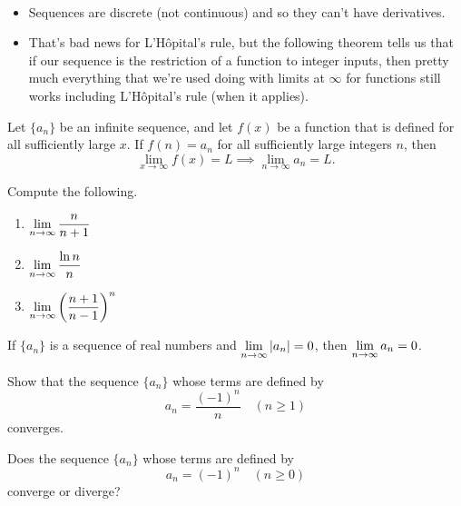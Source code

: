 \newpage

\begin{remark}\,
\begin{itemize}
\item Sequences are discrete (not continuous) and so they can't have derivatives.
\item That's bad news for L'H\^opital's rule, but the following theorem tells us that if our sequence is the restriction of a function to integer inputs, then pretty much everything that we're used doing with limits at $\infty$ for functions still works including L'H\^opital's rule (when it applies).
\end{itemize}
\end{remark}

\begin{theorem}
Let $\{a_n\}$ be an infinite sequence, and let $f(x)$ be a function that is defined for all sufficiently large $x$.
If $f(n) = a_n$ for all sufficiently large integers $n$, then
\begin{equation*}
\lim_{x\to\infty}f(x) = L \implies \lim_{n\to\infty} a_n=  L.
\end{equation*}
\end{theorem}

\begin{example}
Compute the following.
\begin{enumerate}
\item $\displaystyle\lim_{n\to\infty}\frac{n}{n+1}$
\vfill
\item $\displaystyle\lim_{n\to\infty}\frac{\ln n}{n}$
\vfill
\item $\displaystyle\lim_{n\to\infty}\left(\frac{n+1}{n-1}\right)^n$
\vfill
\end{enumerate}
\end{example}


\newpage

\begin{theorem}
If $\{a_n\}$ is a sequence of real numbers and $\displaystyle\lim_{n\to\infty}|a_n|=0$, then $\displaystyle\lim_{n\to\infty}a_n=0$.
\end{theorem}

\begin{example}
Show that the sequence $\{a_n\}$ whose terms are defined by 
\begin{equation*}
a_n = \frac{(-1)^n}{n}\quad (n\ge 1)
\end{equation*}
converges.
\end{example}

\vfill


\begin{example}
Does the sequence $\{a_n\}$ whose terms are defined by
\begin{equation*}
a_n=(-1)^n\quad (n\ge 0)
\end{equation*}
converge or diverge?
\end{example}

